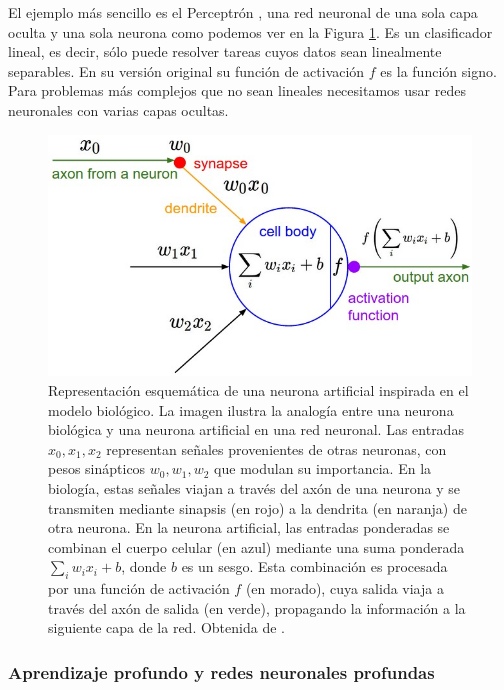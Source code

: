 El ejemplo más sencillo es el Perceptrón \cite{perceptron}, una red neuronal de una sola capa oculta y una sola neurona como podemos ver en la Figura \ref{fig:Perceptron}. Es un clasificador lineal, es decir, sólo puede resolver tareas cuyos datos sean linealmente separables. En su versión original su función de activación $f$ es la función signo. Para problemas más complejos que no sean lineales necesitamos usar redes neuronales con varias capas ocultas.


\begin{figure}
    \centering
    \includegraphics[width=0.75\linewidth]{Plantilla_TFG_latex//imagenes//Inf//2.Fund/neuron_model.jpeg}
    \caption[Representación esquemática de una neurona artificial inspirada en el modelo biológico]{Representación esquemática de una neurona artificial inspirada en el modelo biológico. La imagen ilustra la analogía entre una neurona biológica y una neurona artificial en una red neuronal. Las entradas $x_0,x_1,x_2$  representan señales provenientes de otras neuronas, con pesos sinápticos $w_0, w_1, w_2$ que modulan su importancia. En la biología, estas señales viajan a través del axón de una neurona y se transmiten mediante sinapsis (en rojo) a la dendrita (en naranja) de otra neurona. En la neurona artificial, las entradas ponderadas se combinan el cuerpo celular (en azul) mediante una suma ponderada $\sum_i w_ix_i + b$, donde $b$ es un sesgo. Esta combinación es procesada por una función de activación $f$ (en morado), cuya salida viaja a través del axón de salida (en verde), propagando la información a la siguiente capa de la red. Obtenida de \cite{stanford_231}.}
    \label{fig:Perceptron}
\end{figure}


\subsubsection{Aprendizaje profundo y redes neuronales profundas}

